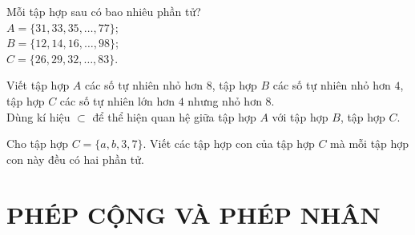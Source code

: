 \begin{bt}%
	Mỗi tập hợp sau có bao nhiêu phần tử?\\
	$A = \{31, 33, 35, \ldots, 77\}$;\\
	$B = \{12, 14, 16, \ldots, 98\}$;\\
	$C = \{26, 29, 32, \ldots, 83\}$.
\end{bt}

\begin{bt}%
	Viết tập hợp $A$ các số tự nhiên nhỏ hơn $8$, tập hợp $B$ các số tự nhiên nhỏ hơn $4$, tập hợp $C$ các số tự nhiên lớn hơn $4$ nhưng nhỏ hơn $8$.\\
	Dùng kí hiệu $\subset$ để thể hiện quan hệ giữa tập hợp $A$ với tập hợp $B$, tập hợp $C$.
\end{bt}

\begin{bt}%
	Cho tập hợp $C = \{a, b, 3, 7\}$. Viết các tập hợp con của tập hợp $C$ mà mỗi tập hợp con này đều có hai phần tử.
\end{bt}

\section{PHÉP CỘNG VÀ PHÉP NHÂN}

